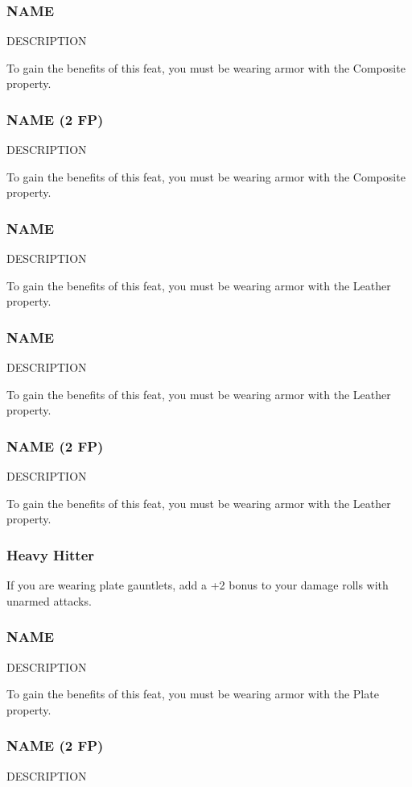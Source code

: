 \subsubsection{NAME} \label{feat::name}
    DESCRIPTION

    To gain the benefits of this feat, you must be wearing armor with the Composite property.
\subsubsection{NAME (2 FP)} \label{feat::name}
    DESCRIPTION

    To gain the benefits of this feat, you must be wearing armor with the Composite property.
\subsubsection{NAME} \label{feat::name}
    DESCRIPTION

    To gain the benefits of this feat, you must be wearing armor with the Leather property.
\subsubsection{NAME} \label{feat::name}
    DESCRIPTION

    To gain the benefits of this feat, you must be wearing armor with the Leather property.
\subsubsection{NAME (2 FP)} \label{feat::name}
    DESCRIPTION

    To gain the benefits of this feat, you must be wearing armor with the Leather property.
\subsubsection{Heavy Hitter} \label{feat::heavyhitter}
    If you are wearing plate gauntlets, add a +2 bonus to your damage rolls with unarmed attacks.
\subsubsection{NAME} \label{feat::name}
    DESCRIPTION

    To gain the benefits of this feat, you must be wearing armor with the Plate property.
\subsubsection{NAME (2 FP)} \label{feat::name}
    DESCRIPTION

